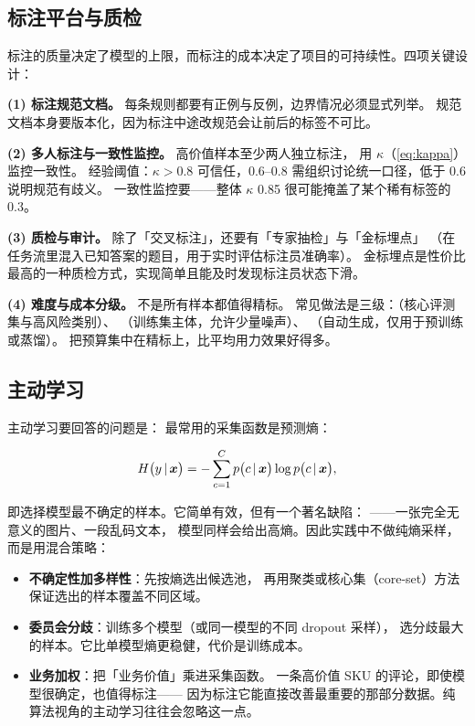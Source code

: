 \subsection{标注平台与质检}

标注的质量决定了模型的上限，而标注的成本决定了项目的可持续性。四项关键设计：

\textbf{(1) 标注规范文档。} 每条规则都要有正例与反例，边界情况必须显式列举。
规范文档本身要版本化，因为标注中途改规范会让前后的标签不可比。

\textbf{(2) 多人标注与一致性监控。} 高价值样本至少两人独立标注，
用 $\kappa$（\cref{eq:kappa}）监控一致性。
经验阈值：$\kappa > 0.8$ 可信任，0.6--0.8 需组织讨论统一口径，低于 0.6 说明规范有歧义。
一致性监控要——整体 $\kappa$ 0.85 很可能掩盖了某个稀有标签的 0.3。

\textbf{(3) 质检与审计。} 除了「交叉标注」，还要有「专家抽检」与「金标埋点」
（在任务流里混入已知答案的题目，用于实时评估标注员准确率）。
金标埋点是性价比最高的一种质检方式，实现简单且能及时发现标注员状态下滑。

\textbf{(4) 难度与成本分级。} 不是所有样本都值得精标。
常见做法是三级：（核心评测集与高风险类别）、
（训练集主体，允许少量噪声）、
（自动生成，仅用于预训练或蒸馏）。
把预算集中在精标上，比平均用力效果好得多。

\subsection{主动学习}

主动学习要回答的问题是：
最常用的采集函数是预测熵：

\begin{equation}
H\big(y \,\vert\, \bm{x}\big) = -\sum_{c=1}^{C} p\big(c \,\vert\, \bm{x}\big) \log p\big(c \,\vert\, \bm{x}\big),
\label{eq:al-entropy}
\end{equation}

即选择模型最不确定的样本。它简单有效，但有一个著名缺陷：
——一张完全无意义的图片、一段乱码文本，
模型同样会给出高熵。因此实践中不做纯熵采样，而是用混合策略：

\begin{itemize}
  \item \textbf{不确定性加多样性}：先按熵选出候选池，
        再用聚类或核心集（core-set）方法保证选出的样本覆盖不同区域。
  \item \textbf{委员会分歧}：训练多个模型（或同一模型的不同 dropout 采样），
        选分歧最大的样本。它比单模型熵更稳健，代价是训练成本。
  \item \textbf{业务加权}：把「业务价值」乘进采集函数。
        一条高价值 SKU 的评论，即使模型很确定，也值得标注——
        因为标注它能直接改善最重要的那部分数据。纯算法视角的主动学习往往会忽略这一点。
\end{itemize}

